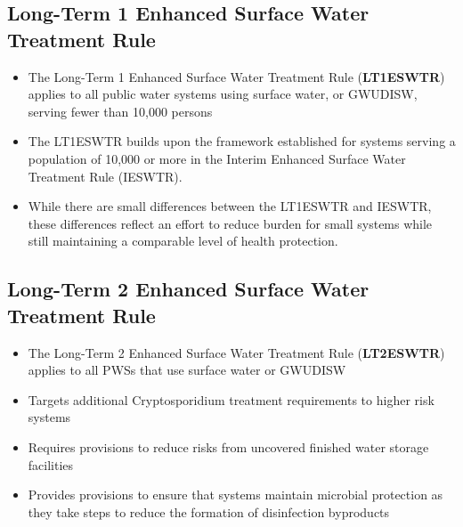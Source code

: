 \subsection{Long-Term 1 Enhanced Surface Water Treatment Rule}
\begin{itemize}
\item The Long-Term 1 Enhanced Surface Water Treatment Rule (\textbf{LT1ESWTR}) applies to all public water systems using surface water, or GWUDISW, serving fewer than 10,000  persons
\item The LT1ESWTR builds upon the framework established for systems serving a population of 10,000 or more in the Interim Enhanced Surface Water Treatment Rule (IESWTR). 
\item While there are small differences between the LT1ESWTR and IESWTR, these differences reflect an effort to reduce burden for small systems while still maintaining a comparable level of health protection.
\end{itemize}


\subsection{Long-Term 2 Enhanced Surface Water Treatment Rule}
\begin{itemize}
\item The Long-Term 2 Enhanced Surface Water Treatment Rule (\textbf{LT2ESWTR}) applies to all PWSs that use surface water or GWUDISW
\item Targets additional Cryptosporidium treatment requirements to higher risk systems
\item Requires provisions to reduce risks from uncovered finished water storage facilities
\item Provides provisions to ensure that systems maintain microbial protection as they take steps to reduce the formation of disinfection byproducts
\end{itemize}

